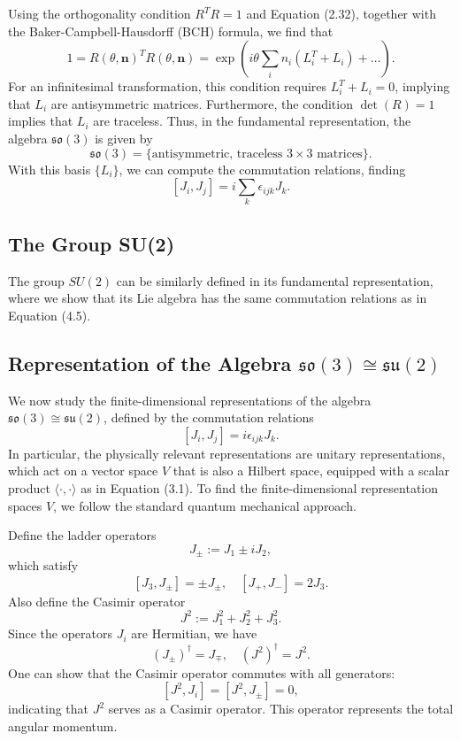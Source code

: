 Using the orthogonality condition $R^T R = 1$ and Equation (2.32), together with the Baker-Campbell-Hausdorff (BCH) formula, we find that
\[
1 = R(\theta, \mathbf{n})^T R(\theta, \mathbf{n}) = \exp \left( i \theta \sum_i n_i (L_i^T + L_i) + \dots \right).
\]
For an infinitesimal transformation, this condition requires $L_i^T + L_i = 0$, implying that $L_i$ are antisymmetric matrices. Furthermore, the condition $\det(R) = 1$ implies that $L_i$ are traceless. Thus, in the fundamental representation, the algebra $\mathfrak{so}(3)$ is given by
\[
\mathfrak{so}(3) = \{ \text{antisymmetric, traceless } 3 \times 3 \text{ matrices} \}.
\]
With this basis $\{L_i\}$, we can compute the commutation relations, finding
\[
[J_i, J_j] = i \sum_k \epsilon_{ijk} J_k.
\]

\subsection{The Group SU(2)}

The group $SU(2)$ can be similarly defined in its fundamental representation, where we show that its Lie algebra has the same commutation relations as in Equation (4.5).

\subsection{Representation of the Algebra $\mathfrak{so}(3) \cong \mathfrak{su}(2)$}

We now study the finite-dimensional representations of the algebra $\mathfrak{so}(3) \cong \mathfrak{su}(2)$, defined by the commutation relations
\[
[J_i, J_j] = i \epsilon_{ijk} J_k.
\]
In particular, the physically relevant representations are unitary representations, which act on a vector space $V$ that is also a Hilbert space, equipped with a scalar product $\langle \cdot, \cdot \rangle$ as in Equation (3.1). To find the finite-dimensional representation spaces $V$, we follow the standard quantum mechanical approach.

Define the ladder operators
\[
J_\pm := J_1 \pm i J_2,
\]
which satisfy
\[
[J_3, J_\pm] = \pm J_\pm, \quad [J_+, J_-] = 2 J_3.
\]
Also define the Casimir operator
\[
J^2 := J_1^2 + J_2^2 + J_3^2.
\]
Since the operators $J_i$ are Hermitian, we have
\[
(J_\pm)^\dagger = J_\mp, \quad (J^2)^\dagger = J^2.
\]
One can show that the Casimir operator commutes with all generators:
\[
[J^2, J_i] = [J^2, J_\pm] = 0,
\]
indicating that $J^2$ serves as a Casimir operator. This operator represents the total angular momentum.

